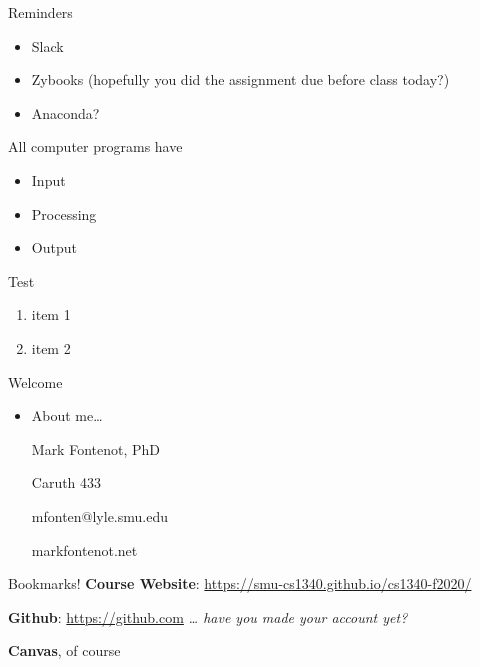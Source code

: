 \begin{frame}{Reminders}
\protect\hypertarget{reminders}{}
\begin{itemize}
\tightlist
\item
  Slack
\item
  Zybooks (hopefully you did the assignment due before class today?)
\item
  Anaconda?
\end{itemize}
\end{frame}

\begin{frame}{All computer programs have}
\protect\hypertarget{all-computer-programs-have}{}
\begin{itemize}
\tightlist
\item
  Input
\item
  Processing
\item
  Output
\end{itemize}
\end{frame}

\begin{frame}{Test}
\protect\hypertarget{test}{}
\begin{enumerate}
\tightlist
\item
  item 1
\item
  item 2
\end{enumerate}
\end{frame}

\begin{frame}{Welcome}
\protect\hypertarget{welcome}{}
\begin{itemize}
\item
  About me\ldots{}

  Mark Fontenot, PhD

  Caruth 433

  mfonten@lyle.smu.edu

  markfontenot.net
\end{itemize}
\end{frame}

\begin{frame}{Bookmarks!}
\protect\hypertarget{bookmarks}{}
\textbf{Course Website}:
\url{https://smu-cs1340.github.io/cs1340-f2020/}

\textbf{Github}: \url{https://github.com} \emph{\ldots{} have you made
your account yet?}

\textbf{Canvas}, of course
\end{frame}

